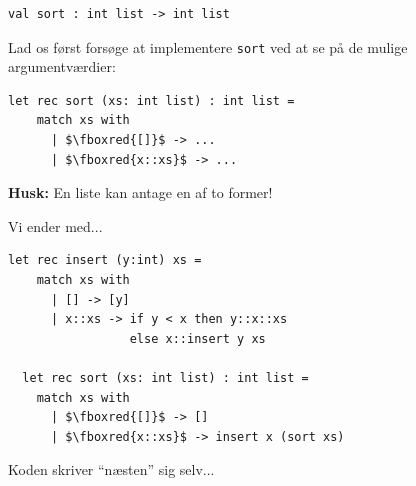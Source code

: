 \documentclass[rgb]{beamer}
\begin{document}
\begin{frame}[fragile]


\begin{lstlisting}[numbers=none,frame=none,mathescape]
  val sort : int list -> int list
\end{lstlisting}

\vspace{3mm}

Lad os først forsøge at implementere \lstinline{sort} ved at se på de
mulige argumentværdier:

\vspace{3mm}

\begin{lstlisting}[numbers=none,frame=none,mathescape]
  let rec sort (xs: int list) : int list =
    match xs with
      | $\fboxred{[]}$ -> ...
      | $\fboxred{x::xs}$ -> ...
\end{lstlisting}

\vspace{3mm}

\textbf{Husk:} En liste kan antage en af to former!

\vspace{3mm}

Vi ender med...

\end{frame}

\begin{frame}[fragile]


\vspace{3mm}

\begin{lstlisting}[numbers=none,frame=none,mathescape]
  let rec insert (y:int) xs =
    match xs with
      | [] -> [y]
      | x::xs -> if y < x then y::x::xs
                 else x::insert y xs

  let rec sort (xs: int list) : int list =
    match xs with
      | $\fboxred{[]}$ -> []
      | $\fboxred{x::xs}$ -> insert x (sort xs)
\end{lstlisting}

\vspace{3mm}

Koden skriver ``næsten'' sig selv...
\end{frame}
\end{document}
